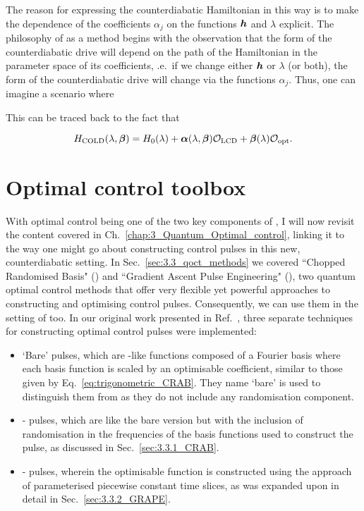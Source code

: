 The reason for expressing the counterdiabatic Hamiltonian in this way is to make the dependence of the coefficients $\alpha_j$ on the functions $\boldsymbol{h}$ and $\lambda$ explicit. The philosophy of  as a method begins with the observation that the form of the counterdiabatic drive will depend on the path of the Hamiltonian in the parameter space of its coefficients, \@i.e.~if we change either $\boldsymbol{h}$ or $\lambda$ (or both), the form of the counterdiabatic drive will change via the functions $\alpha_j$. Thus, one can imagine a scenario where 

This can be traced back to the fact that 

\begin{equation}\label{eq:expandedH}
H_{\rm COLD}(\lambda,\boldsymbol{\beta}) = H_0(\lambda) + {\boldsymbol \alpha}(\lambda,\boldsymbol{\beta}) \mathcal{O}_{\rm LCD} + \boldsymbol{\beta}(\lambda) \mathcal{O}_{\rm opt}.
\end{equation}


\section{Optimal control toolbox}

With optimal control being one of the two key components of , I will now revisit the content covered in Ch.~\ref{chap:3_Quantum_Optimal_control}, linking it to the way one might go about constructing control pulses in this new, counterdiabatic setting. In Sec.~\ref{sec:3.3_qoct_methods} we covered ``Chopped Randomised Basis" () and ``Gradient Ascent Pulse Engineering" (), two quantum optimal control methods that offer very flexible yet powerful approaches to constructing and optimising control pulses. Consequently, we can use them in the setting of  too. In our original work presented in Ref.~\cite{cepaite_counterdiabatic_2023}, three separate techniques for constructing optimal control pulses were implemented:
\begin{itemize}
    \item `Bare' pulses, which are -like functions composed of a Fourier basis where each basis function is scaled by an optimisable coefficient, similar to those given by Eq.~\ref{eq:trigonometric_CRAB}. They name `bare' is used to distinguish them from  as they do not include any randomisation component.
    \item {}- pulses, which are like the bare version but with the inclusion of randomisation in the frequencies of the basis functions used to construct the pulse, as discussed in Sec.~\ref{sec:3.3.1_CRAB}.
    \item {}- pulses, wherein the optimisable function is constructed using the  approach of parameterised piecewise constant time slices, as was expanded upon in detail in Sec.~\ref{sec:3.3.2_GRAPE}. 
\end{itemize}

